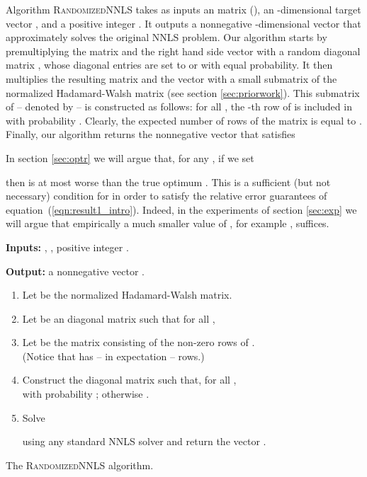 \documentclass[11pt]{article}
\begin{document}
Algorithm \textsc{RandomizedNNLS} takes as inputs an 
matrix  (), an -dimensional target vector , and
a positive integer . It outputs a nonnegative
-dimensional vector  that approximately solves
the original NNLS problem. Our algorithm starts by premultiplying
the matrix  and the right hand side vector  with a random  diagonal matrix , whose diagonal entries are set to
 or  with equal probability. It then multiplies the
resulting matrix  and the vector  with a small submatrix
of the  normalized Hadamard-Walsh matrix  (see
section \ref{sec:priorwork}). This submatrix of  -- denoted
by  -- is constructed as follows: for all ,
the -th row of  is included in  with
probability . Clearly, the expected number of rows of the
matrix  is equal to . Finally, our algorithm returns
the nonnegative vector  that satisfies

In section \ref{sec:optr} we will argue that, for any , if we set

then  is at most 
worse than the true optimum . This is a
sufficient (but not necessary) condition for  in order to
satisfy the relative error guarantees of
equation~(\ref{eqn:result1_intro}). Indeed, in the experiments of
section \ref{sec:exp} we will argue that empirically a much
smaller value of , for example , suffices.
\begin{algorithm}[h]
\begin{framed}

\textbf{Inputs:} , , positive integer .

\vspace{0.1in}

\textbf{Output:} a nonnegative vector .

\begin{enumerate}

\item Let  be the  normalized Hadamard-Walsh matrix.

\item Let  be an  diagonal matrix such that for all ,
    


\item Let  be the matrix consisting of the non-zero rows of . \\
(Notice that  has -- in expectation --  rows.)

\item Construct the  diagonal matrix  such that, for all , \\  with probability ; otherwise .

\item Solve

using any standard NNLS solver and return the vector
.
\end{enumerate}

\end{framed}
\caption{The \textsc{RandomizedNNLS} algorithm.}
\label{alg:alg_sample_fast}
\end{algorithm}
\end{document}
